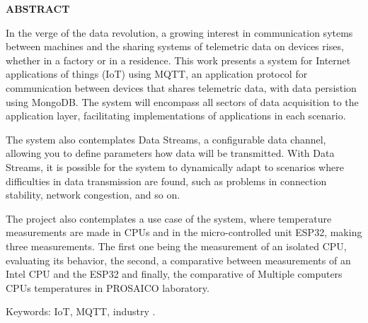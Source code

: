 \begin{center}
\textbf{ABSTRACT}
\end{center}

$\!$\\


In the verge of the data revolution, a growing interest in communication sytems between machines and the sharing systems of telemetric data on devices rises, whether in a factory or in a residence. This work presents a system for Internet applications of things (IoT) using MQTT, an application protocol for communication between devices that shares telemetric data, with data persistion using MongoDB. The system will  encompass all sectors of data acquisition to the application layer, facilitating implementations of applications in each scenario.

The system also contemplates Data Streams, a configurable data channel, allowing you to define parameters how data will be transmitted. With Data Streams, it is possible for the system to dynamically adapt to scenarios where difficulties in data transmission are found, such as problems in connection stability, network congestion, and so on.

The project also contemplates a use case of the system, where temperature measurements are made in CPUs and in the micro-controlled unit ESP32, making three measurements. The first one being the measurement of an isolated CPU, evaluating its behavior, the second, a comparative between measurements of an Intel CPU and the ESP32 and finally, the comparative of Multiple computers CPUs temperatures in PROSAICO laboratory.

\vspace{1cm}

\hspace{-1.3cm}Keywords: IoT, MQTT, industry .